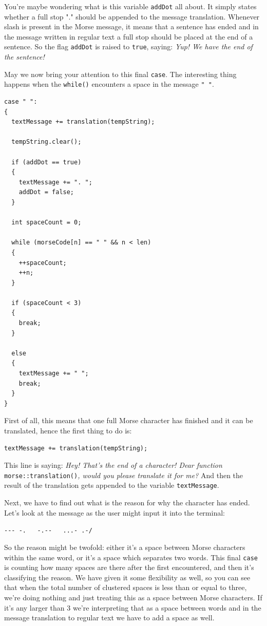 \documentclass[12pt]{report}
\begin{document}
You're maybe wondering what is this variable \verb|addDot| all about. It simply states whether a full stop "." should be appended to the message translation. Whenever slash is present in the Morse message, it means that a sentence has ended and in the message written in regular text a full stop should be placed at the end of a sentence. So the flag \verb|addDot| is raised to \verb|true|, saying: \textit{Yup! We have the end of the sentence!} 

May we now bring your attention to this final \verb|case|. The interesting thing happens when the \verb|while()| encounters a space in the message \verb|" "|. 

\begin{lstlisting}
case " ":
{
  textMessage += translation(tempString);

  tempString.clear();

  if (addDot == true)
  {
    textMessage += ". ";
    addDot = false;
  }

  int spaceCount = 0;

  while (morseCode[n] == " " && n < len)
  {
    ++spaceCount;
    ++n;
  }

  if (spaceCount < 3)
  {
    break;
  }

  else
  {
    textMessage += " ";
    break;
  }
}
\end{lstlisting}

First of all, this means that one full Morse character has finished and it can be translated, hence the first thing to do is:

\begin{lstlisting}
textMessage += translation(tempString);
\end{lstlisting}

This line is saying: \textit{Hey! That's the end of a character! Dear function}
\texttt{morse::translation()}\textit{, would you please translate it for me?} And then the result of the translation gets appended to the variable \verb|textMessage|.

Next, we have to find out what is the reason for why the character has ended. Let's look at the message as the user might input it into the terminal:

\begin{snugshade}
\verb|--- -.   -.--   ...- .-/|
\end{snugshade}


So the reason might be twofold: either it's a space between Morse characters within the same word, or it's a space which separates two words. This final \verb|case| is counting how many spaces are there after the first encountered, and then it's classifying the reason. We have given it some flexibility as well, so you can see that when the total number of clustered spaces is less than or equal to three, we're doing nothing and just treating this as a space between Morse characters. If it's any larger than 3 we're interpreting that as a space between words and in the message translation to regular text we have to add a space as well.
\end{document}

